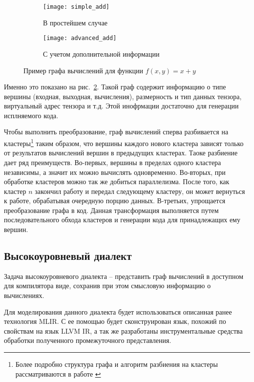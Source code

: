 \begin{figure}[h]
  \begin{subfigure}{.3\textwidth}
    \centering
    \texttt{[image: simple\_add]}
    \caption{В простейшем случае}
    \label{fig:simple_add}
  \end{subfigure}
  \begin{subfigure}{.7\textwidth}
    \centering
    \texttt{[image: advanced\_add]}
    \caption{С учетом дополнительной информации}
    \label{fig:advanced_add}
  \end{subfigure}
  \caption{Пример графа вычислений для функции $f(x, y) = x + y$}
  \label{fig:add}
\end{figure}


Именно это показано на рис.~\ref{fig:advanced_add}. Такой граф содержит
информацию о типе вершины (входная, выходная, вычисления), размерность и тип
данных тензора, виртуальный адрес тензора и т.д. Этой инофрмации достаточно
для генерации исплняемого кода.

Чтобы выполнить преобразование, граф вычислений сперва разбивается на 
кластеры\footnote{Более подробно структура графа и алгоритм разбиения на кластеры
рассматриваются в работе \cite{graph}} таким образом, что вершины каждого нового кластера
зависят только от результатов вычислений вершин в предыдущих кластерах. Таоке
разбиение дает ряд преимуществ. Во-первых, вершины в пределах одного кластера
независимы, а значит их можно вычислять одновременно. Во-вторых, при обработке
кластеров можно так же добиться параллелизма. После того, как кластер $n$
закончил работу и передал следующему кластеру, он может вернуться к работе,
обрабатывая очередную порцию данных. В-третьих, упрощается преобразование графа
в код. Данная трансформация выполняется путем последовательного обхода кластеров
и генерации кода для принадлежащих ему вершин.

\subsection{Высокоуровневый диалект}
Задача высокоуровневого диалекта -- представить граф вычислений в доступном для
компилятора виде, сохранив при этом смысловую информацию о вычислениях.

Для моделирования данного диалекта будет использоваться описанная ранее
технология MLIR. С ее помощью будет сконструирован язык, похожий по свойствам
на язык LLVM IR, а так же разработаны инструментальные средства обработки
полученного промежуточного представления.

